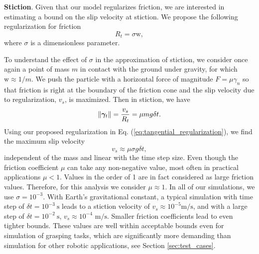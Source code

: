 \textbf{Stiction}. Given that our model regularizes friction, we are interested
in estimating a bound on the slip velocity at stiction. We propose the following
regularization for friction
\begin{equation}
    R_t = \sigma \text{w},
    \label{eq:tangential_regularization}
\end{equation}
where $\sigma$ is a dimensionless parameter.

To understand the effect of $\sigma$ in the approximation of stiction, we
consider once again a point of mass $m$ in contact with the ground under
gravity, for which $\text{w}\approx 1/m$. We push the particle with a horizontal
force of magnitude $F=\mu\gamma_n$ so that friction is right at the boundary of
the friction cone and the slip velocity due to regularization, $v_s$, is
maximized. Then in stiction, we have
\begin{equation*}
    \|{\bm\gamma}_t\| = \frac{v_s}{R_t} = \mu m g \delta t.
\end{equation*}
Using our proposed regularization in Eq. (\ref{eq:tangential_regularization}),
we find the maximum slip velocity
\begin{equation}
    v_s \approx \mu\sigma g \delta t,
    \label{eq:slip_estimation}
\end{equation}
independent of the mass and linear with the time step size. Even though the
friction coefficient $\mu$ can take any non-negative value, most often in
practical applications $\mu < 1$. Values in the order of 1 are in fact
considered as large friction values. Therefore, for this analysis we consider
$\mu\approx 1$. In all of our simulations, we use $\sigma=10^{-3}$. With Earth's
gravitational constant, a typical simulation with time step of $\delta
t=10^{-3}~\text{s}$ leads to a stiction velocity of $v_s\approx
10^{-5}\text{m}/\text{s}$, and with a large step of $\delta t=10^{-2}~\text{s}$,
$v_s\approx 10^{-4}\text{ m}/\text{s}$. Smaller friction coefficients lead to
even tighter bounds. These values are well within acceptable bounds even for
simulation of grasping tasks, which are significantly more demanding than
simulation for other robotic applications, see Section \ref{sec:test_cases}.

